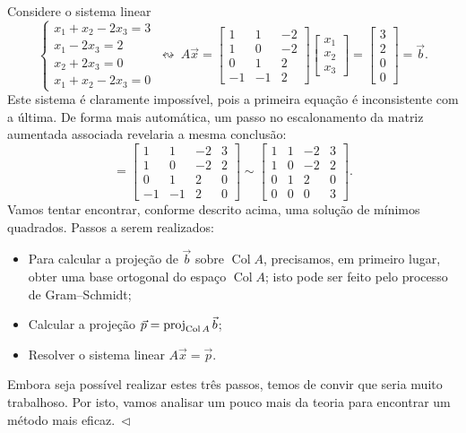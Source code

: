 \begin{ex}\label{exp:minquad1}
  Considere o sistema linear
  \begin{equation}
  \left\{
    \begin{array}{ll}
      x_1 + x_2 - 2x_3 = 3 \\
      x_1  - 2x_3 = 2 \\
      x_2 + 2x_3 = 0 \\
      x_1 + x_2 - 2x_3 = 0
    \end{array}
  \right. \ \leftrightsquigarrow  \
  A \vec{x} = \begin{bmatrix}
    1 & 1 & -2 \\ 1 & 0 & -2 \\ 0 & 1 & 2 \\ -1 & -1 & 2
  \end{bmatrix}
  \begin{bmatrix}
    x_1 \\ x_2 \\ x_3
  \end{bmatrix} =
  \begin{bmatrix}
    3 \\ 2 \\ 0 \\ 0
  \end{bmatrix} = \vec{b}.
  \end{equation} Este sistema é claramente impossível, pois a primeira equação é inconsistente com a última. De forma mais automática, um passo no escalonamento da matriz aumentada associada revelaria a mesma conclusão:
  \begin{equation}
  [\, A \ | \ \vec{b} \, ] = \begin{bmatrix}
    1 & 1 & -2 & 3 \\ 1 & 0 & -2 & 2 \\ 0 & 1 & 2 & 0 \\ -1 & -1 & 2 & 0
  \end{bmatrix}   \sim
  \begin{bmatrix}
    1 & 1 & -2 & 3 \\ 1 & 0 & -2 & 2 \\ 0 & 1 & 2 & 0 \\ 0 & 0 & 0 & 3
  \end{bmatrix} .
  \end{equation} Vamos tentar encontrar, conforme descrito acima, uma solução de mínimos quadrados. Passos a serem realizados:
  \begin{itemize}
  \item Para calcular a projeção de $\vec{b}$ sobre $\operatorname{Col} A$, precisamos, em primeiro lugar, obter uma base ortogonal do espaço $\operatorname{Col} A$; isto pode ser feito pelo processo de Gram--Schmidt;
  \item Calcular a projeção $\vec{p} = \operatorname{proj}_{\operatorname{Col} A} \vec{b}$;
  \item Resolver o sistema linear $A \vec{x} = \vec{p}$.
  \end{itemize} Embora seja possível realizar estes três passos, temos de convir que seria muito trabalhoso. Por isto, vamos analisar um pouco mais da teoria para encontrar um método mais eficaz$. \ \lhd$
\end{ex}

